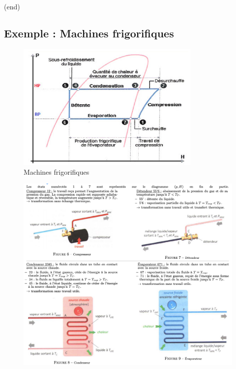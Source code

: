  (end)
\subsection{Exemple : Machines frigorifiques} %
\label{sub:Exemple : Machines frigorifiques}

\begin{figure}[H] %
  \centering
  \includegraphics[width=0.8\textwidth]{./assets/Machines frigorifiques 1.png}
  \caption{Machines frigorifiques}
\end{figure}

\begin{figure}[H] %
  \centering
  \includegraphics[width=\textwidth]{./assets/Machines frigorifiques 2.png}
\end{figure}



